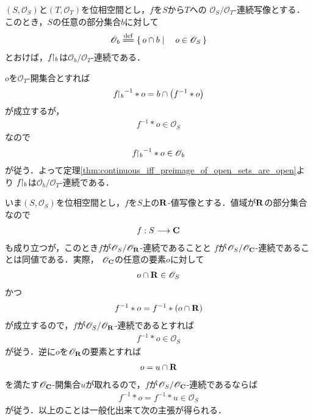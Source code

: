 	\begin{screen}
		\begin{thm}[定義域を制限しても連続]
			$(S,\mathscr{O}_{S})$と$(T,\mathscr{O}_{T})$を位相空間とし，$f$を$S$から$T$への
			$\mathscr{O}_{S}/\mathscr{O}_{T}$-連続写像とする．
			このとき，$S$の任意の部分集合$b$に対して
			\begin{align}
				\mathscr{O}_{b} \defeq \Set{o \cap b}{o \in \mathscr{O}_{S}}
			\end{align}
			とおけば，$f\hspace{-0.41em}\upharpoonright_{b}$は$\mathscr{O}_{b}/\mathscr{O}_{T}$-連続である．
		\end{thm}
	\end{screen}
	
	\begin{sketch}
		$o$を$\mathscr{O}_{T}$-開集合とすれば
		\begin{align}
			{f\hspace{-0.41em}\upharpoonright_{b}}^{-1} \ast o = b \cap \left( f^{-1} \ast o \right)
		\end{align}
		が成立するが，
		\begin{align}
			f^{-1} \ast o \in \mathscr{O}_{S}
		\end{align}
		なので
		\begin{align}
			{f\hspace{-0.41em}\upharpoonright_{b}}^{-1} \ast o \in \mathscr{O}_{b}
		\end{align}
		が従う．よって定理\ref{thm:continuous_iff_preimage_of_open_sets_are_open}より
		$f\hspace{-0.41em}\upharpoonright_{b}$は$\mathscr{O}_{b}/\mathscr{O}_{T}$-連続である．
		\QED
	\end{sketch}
	
	いま$(S,\mathscr{O}_{S})$を位相空間とし，$f$を$S$上の$\mathbf{R}$-値写像とする．値域が$\mathbf{R}$の部分集合なので
	\begin{align}
		f:S \longrightarrow \mathbf{C}
	\end{align}
	も成り立つが，このとき$f$が$\mathscr{O}_{S}/\mathscr{O}_{\mathbf{R}}$-連続であることと
	$f$が$\mathscr{O}_{S}/\mathscr{O}_{\mathbf{C}}$-連続であることは同値である．実際，
	$\mathscr{O}_{\mathbf{C}}$の任意の要素$o$に対して
	\begin{align}
		o \cap \mathbf{R} \in \mathscr{O}_{S}
	\end{align}
	かつ
	\begin{align}
		f^{-1} \ast o = f^{-1} \ast (o \cap \mathbf{R})
	\end{align}
	が成立するので，$f$が$\mathscr{O}_{S}/\mathscr{O}_{\mathbf{R}}$-連続であるとすれば
	\begin{align}
		f^{-1} \ast o \in \mathscr{O}_{S}
	\end{align}
	が従う．逆に$o$を$\mathscr{O}_{\mathbf{R}}$の要素とすれば
	\begin{align}
		o = u \cap \mathbf{R}
	\end{align}
	を満たす$\mathscr{O}_{\mathbf{C}}$-開集合$u$が取れるので，$f$が$\mathscr{O}_{S}/\mathscr{O}_{\mathbf{C}}$-連続であるならば
	\begin{align}
		f^{-1} \ast o = f^{-1} \ast u \in \mathscr{O}_{S}
	\end{align}
	が従う．以上のことは一般化出来て次の主張が得られる．
	
